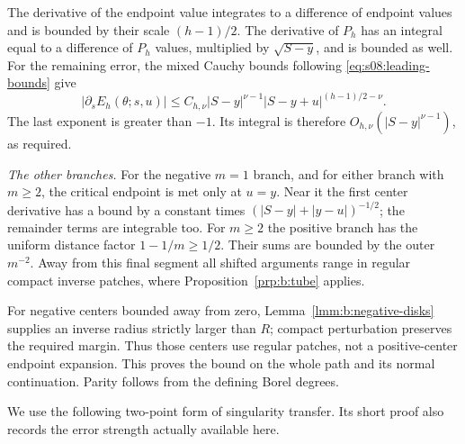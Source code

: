 \begin{prf}
The derivative of the endpoint value integrates to a difference
of endpoint values and is bounded by their scale $(h-1)/2$.
The derivative of $P_h$ has an integral equal to a difference of
$P_h$ values, multiplied by $\sqrt{S-y}$, and is bounded as well.
For the remaining error, the mixed Cauchy bounds following
\eqref{eq:s08:leading-bounds} give
\[
 |\partial_sE_h(\theta;s,u)|
 \leq C_{h,\nu}|S-y|^{\nu-1}
                    |S-y+u|^{(h-1)/2-\nu}.
\]
The last exponent is greater than $-1$. Its integral is therefore
$O_{h,\nu}(|S-y|^{\nu-1})$, as required.

\smallskip\noindent
\emph{The other branches.}
For the negative $m=1$ branch, and for either branch with $m\geq2$,
the critical endpoint is met only at $u=y$. Near it the first
center derivative has a bound by a constant times
$(|S-y|+|y-u|)^{-1/2}$; the remainder terms are integrable too.
For $m\geq2$ the positive branch has the uniform distance factor
$1-1/m\geq1/2$. Their sums are bounded by the outer $m^{-2}$.
Away from this final segment all shifted arguments range in
regular compact inverse patches, where
Proposition~\ref{prp:b:tube} applies.

For negative centers bounded
away from zero, Lemma~\ref{lmm:b:negative-disks} supplies an inverse
radius strictly larger than $R$; compact perturbation preserves the
required margin. Thus those centers use regular patches, not a
positive-center endpoint expansion. This proves the bound on the whole path and its normal
continuation. Parity follows from the defining Borel degrees.
\end{prf}

We use the following two-point form of singularity transfer. Its
short proof also records the error strength actually available here.


